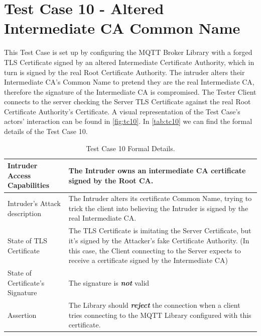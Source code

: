 \documentclass[binding=0.6cm,noexaminfo]{sapthesis}
\begin{document}
\section{Test Case 10 - Altered Intermediate CA Common Name}
This Test Case is set up by configuring the MQTT Broker Library with a forged TLS Certificate signed by an altered Intermediate Certificate Authority, which in turn is signed by the real Root Certificate Authority. The intruder alters their Intermediate CA’s Common Name to pretend they are the real Intermediate CA, therefore the signature of the Intermediate CA is compromised. The Tester Client connects to the server checking the Server TLS Certificate against the real Root Certificate Authority’s Certificate. A visual representation of the Test Case's actors' interaction can be found in \autoref{fig:tc10}.  In \autoref{tab:tc10} we can find the formal details of the Test Case 10.

\begin{table}
\begin{center}
\begin{tabular}{| p{6cm} | p{6cm} |}
\hline
Intruder Access Capabilities & The Intruder owns an intermediate CA certificate signed by the Root CA. \\
\hline
Intruder’s Attack description & The Intruder alters its certificate Common Name, trying to trick the client into believing the Intruder is signed by the real Intermediate CA. \\
\hline
State of TLS Certificate & The TLS Certificate is imitating the Server Certificate, but it’s signed by the Attacker’s fake Certificate Authority. (In this case, the Client connecting to the Server expects to receive a certificate signed by the Intermediate CA) \\
\hline
State of Certificate’s Signature & The signature is \textbf{\textit{not}} valid \\
\hline
Assertion & The Library should \textbf{\textit{reject}} the connection when a client tries connecting to the MQTT Library configured with this certificate. \\
\hline
\end{tabular}
\caption{Test Case 10 Formal Details.}
\label{tab:tc10}
\end{center}
\end{table}
\end{document}
